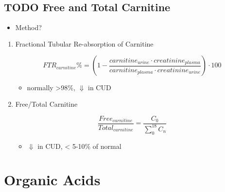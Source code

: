 \documentclass{scrartcl}
\begin{document}
\subsection{{\bfseries\sffamily TODO} Free and Total Carnitine}
\label{sec:org765ee46}
\begin{itemize}
\item Method?
\end{itemize}
\begin{enumerate}
\item Fractional Tubular Re-absorption of Carnitine
\label{sec:orgbb2f858}

\begin{equation*}
FTR_{carnitine}\% = \left( 1 -  \frac{carnitine_{urine} \cdot creatinine_{plasma}}{carnitine_{plasma} \cdot creatinine_{urine}}\right) \cdot 100
\end{equation*}

\begin{itemize}
\item normally >98\%, \(\Downarrow\) in CUD
\end{itemize}

\item Free/Total Carnitine
\label{sec:org640bcd9}

\[
\frac{Free_{carnitine}}{Total_{carnitine}} = \frac{C_0}{\sum_{0}^{18} C_n}
\]

\begin{itemize}
\item \(\Downarrow\) in CUD, < 5-10\% of normal
\end{itemize}
\end{enumerate}
\section{Organic Acids}
\label{sec:org4d963d6}
\end{document}
